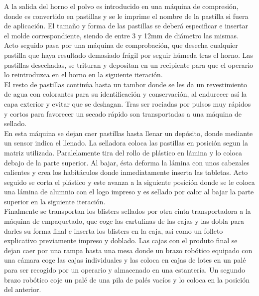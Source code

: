 A la salida del horno el polvo es introducido en una máquina de compresión, donde es convertido en pastillas y se le imprime el nombre de la pastilla si fuera de aplicación. El tamaño y forma de las pastillas se deberá especificar e insertar el molde correspondiente, siendo de entre 3 y 12mm de diámetro las mismas.  Acto seguido pasa por una máquina de comprobación, que desecha cualquier pastilla que haya resultado demasiado frágil por seguir húmeda tras el horno. Las pastillas desechadas, se trituran y depositan en un recipiente para que el operario lo reintroduzca en el horno en la siguiente iteración. 
\\

El resto de pastillas continúa hasta un tambor donde se les da un revestimiento de agua con colorantes para su identificación y conservación, al endurecer así la capa exterior y evitar que se deshagan. Tras ser rociadas por pulsos muy rápidos y cortos para favorecer un secado rápido son transportadas a una máquina de sellado.
\\

En esta máquina se dejan caer pastillas hasta llenar un depósito, donde mediante un sensor indica el llenado. La selladora coloca las pastillas en posición segun la matriz utilizada. Paralelamente tira del rollo de plástico en lámina y lo coloca debajo de la parte superior. Al bajar, ésta deforma la lámina con unos cabezales calientes y crea los habitáculos donde inmediatamente inserta las tabletas. Acto seguido se corta el plástico y este avanza a la siguiente posición donde se le coloca una lámina de alumnio con el logo impreso y es sellado por calor al bajar la parte superior en la siguiente iteración. 
\\

Finalmente se transportan los blisters sellados por otra cinta transportadora a la máquina de empaquetado, que coge las cartulinas de las cajas y las dobla para darles su forma final e inserta los blisters en la caja, asi como un folleto explicativo previamente impreso y doblado. Las cajas con el produto final se dejan caer por una rampa hasta una mesa donde un brazo robótico equipado con una cámara coge las cajas individuales y las coloca en cajas de lotes en un palé para ser recogido por un operario y almacenado en una estantería. Un segundo brazo robótico coje un palé de una pila de palés vacíos y lo coloca en la posición del anterior.
\\
